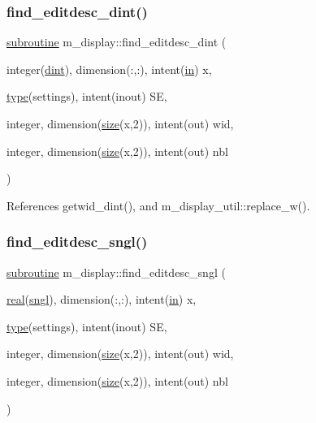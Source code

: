 \subsubsection{\texorpdfstring{find\+\_\+editdesc\+\_\+dint()}{find\_editdesc\_dint()}}
{\footnotesize\ttfamily \hyperlink{M__stopwatch_83_8txt_acfbcff50169d691ff02d4a123ed70482}{subroutine} m\+\_\+display\+::find\+\_\+editdesc\+\_\+dint (\begin{DoxyParamCaption}\item[{integer(\hyperlink{namespacem__display_a73f772e9702cad6f40b78364fde2c7cd}{dint}), dimension(\+:,\+:), intent(\hyperlink{M__journal_83_8txt_afce72651d1eed785a2132bee863b2f38}{in})}]{x,  }\item[{\hyperlink{stop__watch_83_8txt_a70f0ead91c32e25323c03265aa302c1c}{type}(settings), intent(inout)}]{SE,  }\item[{integer, dimension(\hyperlink{what__overview_81_8txt_ab5692ed87074f1d5ec850a9ffa8b5af9}{size}(x,2)), intent(out)}]{wid,  }\item[{integer, dimension(\hyperlink{what__overview_81_8txt_ab5692ed87074f1d5ec850a9ffa8b5af9}{size}(x,2)), intent(out)}]{nbl }\end{DoxyParamCaption})\hspace{0.3cm}{\ttfamily [private]}}



References getwid\+\_\+dint(), and m\+\_\+display\+\_\+util\+::replace\+\_\+w().

\mbox{\label{namespacem__display_aa41974a4b32f6169cadb3da72991653f}} 
\subsubsection{\texorpdfstring{find\+\_\+editdesc\+\_\+sngl()}{find\_editdesc\_sngl()}}
{\footnotesize\ttfamily \hyperlink{M__stopwatch_83_8txt_acfbcff50169d691ff02d4a123ed70482}{subroutine} m\+\_\+display\+::find\+\_\+editdesc\+\_\+sngl (\begin{DoxyParamCaption}\item[{\hyperlink{read__watch_83_8txt_abdb62bde002f38ef75f810d3a905a823}{real}(\hyperlink{namespacem__display_a2ac86bc535c3ccc5947dbb3109c666b5}{sngl}), dimension(\+:,\+:), intent(\hyperlink{M__journal_83_8txt_afce72651d1eed785a2132bee863b2f38}{in})}]{x,  }\item[{\hyperlink{stop__watch_83_8txt_a70f0ead91c32e25323c03265aa302c1c}{type}(settings), intent(inout)}]{SE,  }\item[{integer, dimension(\hyperlink{what__overview_81_8txt_ab5692ed87074f1d5ec850a9ffa8b5af9}{size}(x,2)), intent(out)}]{wid,  }\item[{integer, dimension(\hyperlink{what__overview_81_8txt_ab5692ed87074f1d5ec850a9ffa8b5af9}{size}(x,2)), intent(out)}]{nbl }\end{DoxyParamCaption})\hspace{0.3cm}{\ttfamily [private]}}



